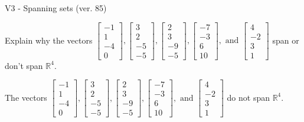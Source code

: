 \begin{exercise}
  \begin{exerciseTitle}V3 - Spanning sets (ver. 85)\end{exerciseTitle}
  \begin{exerciseStatement}
    Explain why the vectors \(\left[\begin{array}{r}
-1 \\
1 \\
-4 \\
0
\end{array}\right] , \left[\begin{array}{r}
3 \\
2 \\
-5 \\
-5
\end{array}\right] , \left[\begin{array}{r}
2 \\
3 \\
-9 \\
-5
\end{array}\right] , \left[\begin{array}{r}
-7 \\
-3 \\
6 \\
10
\end{array}\right] , \text{ and } \left[\begin{array}{r}
4 \\
-2 \\
3 \\
1
\end{array}\right]\) span or don't span \(\mathbb{R}^4\). 
	


  \end{exerciseStatement}
  \begin{exerciseAnswer}
   The vectors \(\left[\begin{array}{r}
-1 \\
1 \\
-4 \\
0
\end{array}\right] , \left[\begin{array}{r}
3 \\
2 \\
-5 \\
-5
\end{array}\right] , \left[\begin{array}{r}
2 \\
3 \\
-9 \\
-5
\end{array}\right] , \left[\begin{array}{r}
-7 \\
-3 \\
6 \\
10
\end{array}\right] , \text{ and } \left[\begin{array}{r}
4 \\
-2 \\
3 \\
1
\end{array}\right]\) 
  	 do not  
	span \(\mathbb{R}^4\).
  



\end{exerciseAnswer}
\end{exercise}
